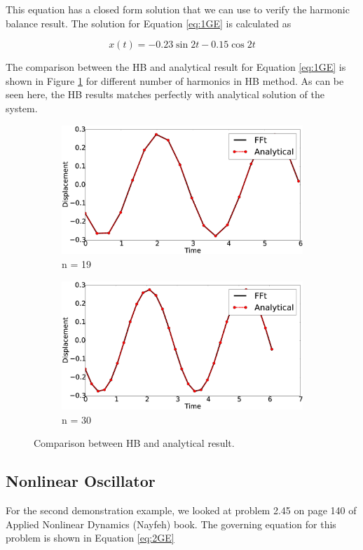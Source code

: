 \documentclass[12pt, a4paper]{extarticle}
\begin{document}
This equation has a closed form solution that we can use to verify the harmonic balance result. The solution for Equation \eqref{eq:1GE} is calculated as

\begin{equation}
	x(t) = -0.23 \sin 2t - 0.15 \cos 2t
\end{equation}

The comparison between the HB and analytical result for Equation \eqref{eq:1GE} is shown in Figure \ref{fig:R1} for different number of harmonics in HB method. As can be seen here, the HB results matches perfectly with analytical solution of the system.

\begin{figure}[H]
	\centering
	\begin{subfigure}[h]{8.0 cm}
		\includegraphics[width=8.0 cm]{figure/1N19.eps}
		\caption{n = 19}
	\end{subfigure}
	\begin{subfigure}[h]{8.0 cm}
        \includegraphics[width=8.0 cm]{figure/1N30.eps}
		\caption{n = 30}
    \end{subfigure}
    \caption{Comparison between HB and analytical result.}
    \label{fig:R1}
\end{figure}

\subsection{Nonlinear Oscillator}
For the second demonstration example, we looked at problem 2.45 on page 140 of Applied Nonlinear Dynamics (Nayfeh) book. The governing equation for this problem is shown in Equation \eqref{eq:2GE}
\end{document}
